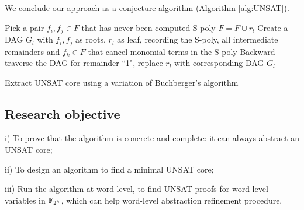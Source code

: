 \begin{figure}[hbt]
\end{figure}

We conclude our approach as a conjecture algorithm (Algorithm \ref{alg:UNSAT}). 

\begin{algorithm}[hbt]
\SetAlgoNoLine
{
	Pick a pair $f_i,f_j\in F$ that has never been computed S-poly\;
	{
		$F = F\cup r_l$\;
		Create a DAG $G_l$ with $f_i,f_j$ as roots, $r_l$ as leaf, recording the S-poly, all intermediate remainders and $f_k\in F$ that cancel monomial terms in the S-poly\;
	}
}
Backward traverse the DAG for remainder ``1", replace $r_l$ with corresponding DAG $G_l$\;
\caption {Extract UNSAT core using a variation of Buchberger's algorithm}\label{alg:UNSAT}
\end{algorithm}

\subsection{Research objective}
i) To prove that the algorithm is concrete and complete: it can always abstract an UNSAT core;

ii) To design an algorithm to find a minimal UNSAT core;

iii) Run the algorithm at word level, to find UNSAT proofs for word-level variables in ${\mathbb{F}}_{2^k}$, which 
can help word-level abstraction refinement procedure.

